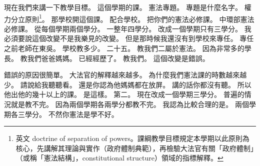 \hypertarget{c01:cue:542}{}現在我們來講一下教學目標。
\hypertarget{c01:cue:543}{}這個學期的課。
\hypertarget{c01:cue:544}{}憲法專題。
\hypertarget{c01:cue:545}{}專題是什麼名字。
\hypertarget{c01:cue:546}{}權力分立原則\footnote{英文 doctrine of separation of powers。課綱教學目標規定本學期以此原則為核心，先講解其理論與實作（政府體制典範），再檢驗大法官有關「政府體制」（或稱「憲法結構」，constitutional structure）領域的指標解釋。}。
\hypertarget{c01:cue:547}{}那學校開這個課。
\hypertarget{c01:cue:548}{}配合學校。
\hypertarget{c01:cue:549}{}把你們的憲法必修課。
\hypertarget{c01:cue:550}{}中環部憲法必修課。
\hypertarget{c01:cue:551}{}從每個學期兩個學分。
\hypertarget{c01:cue:552}{}一整年四學分。
\hypertarget{c01:cue:553}{}改成一個學期只有三學分。
\hypertarget{c01:cue:554}{}我必須要說這個改變不是我樂見的改變。
\hypertarget{c01:cue:555}{}但是那時候我還沒有到學校來專任。
\hypertarget{c01:cue:556}{}專任之前老師在東吳。
\hypertarget{c01:cue:557}{}學校教多少。
\hypertarget{c01:cue:558}{}二十五。
\hypertarget{c01:cue:559}{}教我們二屬於憲法。
\hypertarget{c01:cue:560}{}因為非常多的學長。
\hypertarget{c01:cue:561}{}教我們爸爸媽媽。
\hypertarget{c01:cue:562}{}已經經歷了。
\hypertarget{c01:cue:563}{}教我們。
\hypertarget{c01:cue:564}{}這個改變是錯誤。

\hypertarget{c01:cue:565}{}錯誤的原因很簡單。
\hypertarget{c01:cue:566}{}大法官的解釋越來越多。
\hypertarget{c01:cue:567}{}為什麼我們憲法課的時數越來越少。
\hypertarget{c01:cue:568}{}請說給我聽聽看。
\hypertarget{c01:cue:569}{}還是你認為他媽媽都在放屏。
\hypertarget{c01:cue:570}{}講的話你都沒有聽。
\hypertarget{c01:cue:571}{}所以他出他的幾十以上的課。
\hypertarget{c01:cue:572}{}是這樣。
\hypertarget{c01:cue:573}{}第二。
\hypertarget{c01:cue:574}{}現在改成一個學期三學分。
\hypertarget{c01:cue:575}{}普遍的情況就是教不完。
\hypertarget{c01:cue:576}{}因為兩個學期各兩學分都教不完。
\hypertarget{c01:cue:577}{}我認為比較合理的是。
\hypertarget{c01:cue:578}{}兩個學期各三學分。
\hypertarget{c01:cue:579}{}不然你憲法是學不好。

